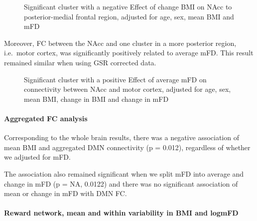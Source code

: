 \documentclass[
]{article}
\begin{document}
\begin{figure}
\caption{Significant cluster with a negative Effect of change BMI on NAcc to posterior-medial frontal region, adjusted for age, sex, mean BMI and mFD}\label{fig:BMIFDagesexNACCcgnBMIdeact}
\end{figure}

Moreover, FC between the NAcc and one cluster in a more posterior region, i.e.~motor cortex, was significantly positively related to average mFD. This result remained similar when using GSR corrected data.

\begin{figure}
\caption{Significant cluster with a positive Effect of average mFD on connectivity between NAcc and motor cortex, adjusted for age, sex, mean BMI, change in BMI and change in mFD}\label{fig:BMIFDagesexNACCavgFDact}
\end{figure}

\hypertarget{aggregated-fc-analysis-1}{%
\paragraph{Aggregated FC analysis}\label{aggregated-fc-analysis-1}}

Corresponding to the whole brain results, there was a negative association of mean BMI and aggregated DMN connectivity (p = 0.012), regardless of whether we adjusted for mFD.

The association also remained significant when we split mFD into average and change in mFD (p = NA, 0.0122) and there was no significant association of mean or change in mFD with DMN FC.

\hypertarget{reward-network-mean-and-within-variability-in-bmi-and-logmfd}{%
\paragraph{Reward network, mean and within variability in BMI and logmFD}\label{reward-network-mean-and-within-variability-in-bmi-and-logmfd}}
\end{document}
